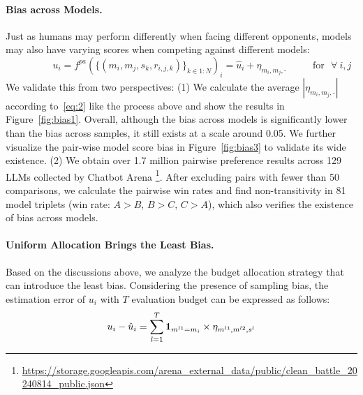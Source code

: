 \paragraph{Bias across Models.} Just as humans may perform differently when facing different opponents, models may also have varying scores when competing against different models:
\begin{equation}
    \ \ \ \ \ \ \ \ \ \ \ \ \ \ \ \ \ \ \ u_i=f^{pa}(\{(m_i,m_j,s_k,r_{i,j,k})\}_{k\in 1:N})_i = \hat{u}_i + \eta_{m_i,m_j,\text{-}} \ \ \ \ \ \ \ \ \ \ \ \ \text{for} \ \ \ \forall \  i,j
    \label{eq:2}
\end{equation}
We validate this from two perspectives:  
(1) We calculate the average $|\eta_{m_i,m_j,\text{-}}|$ according to~\eqref{eq:2} like the process above and show the results in Figure~\ref{fig:bias1}. Overall, although the bias across models is significantly lower than the bias across samples, it still exists at a scale around 0.05. We further visualize the pair-wise model score bias in Figure~\ref{fig:bias3} to validate its wide existence. 
(2) We obtain over 1.7 million pairwise preference results across 129 LLMs collected by Chatbot Arena \footnote{\url{https://storage.googleapis.com/arena_external_data/public/clean_battle_20240814_public.json}}. After excluding pairs with fewer than 50 comparisons, we calculate the pairwise win rates and find non-transitivity in 81 model triplets (win rate: $A > B$, $B > C$, $C > A$), which also verifies the existence of bias across models.




\paragraph{Uniform Allocation Brings the Least Bias.} 
Based on the discussions above, we analyze the budget allocation strategy that can introduce the least bias. 
Considering the presence of sampling bias, the estimation error of $u_i$ with $T$ evaluation budget can be expressed as follows:
\begin{equation}
    u_i-\hat{u}_i = \sum_{l=1}^T \bm{1}_{m^{l1}=m_i} \times \eta_{m^{l1},m^{l2},s^l}
    \label{eq:3}
\end{equation}

